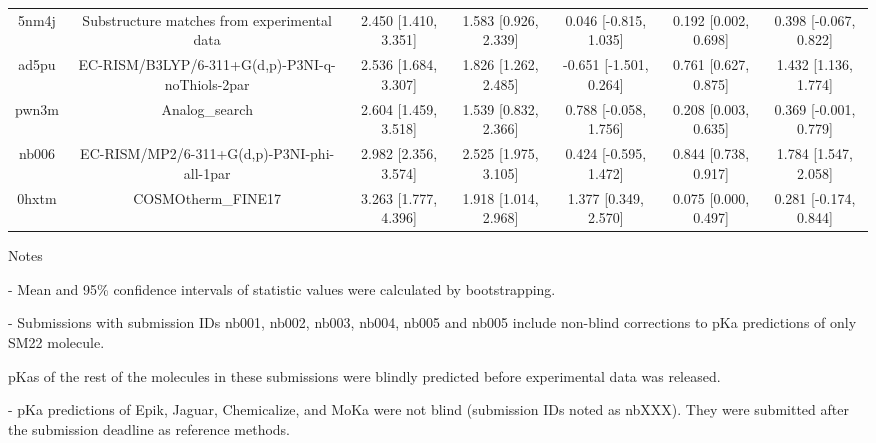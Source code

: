 \documentclass{article}
\begin{document}
\begin{center}
\begin{longtable}{|ccccccc|}
 5nm4j &        Substructure matches from experimental data &  2.450 [1.410, 3.351] &  1.583 [0.926, 2.339] &    0.046 [-0.815, 1.035] &  0.192 [0.002, 0.698] &  0.398 [-0.067, 0.822] \\
 ad5pu &    EC-RISM/B3LYP/6-311+G(d,p)-P3NI-q-noThiols-2par &  2.536 [1.684, 3.307] &  1.826 [1.262, 2.485] &   -0.651 [-1.501, 0.264] &  0.761 [0.627, 0.875] &   1.432 [1.136, 1.774] \\
 pwn3m &                                     Analog\_search &  2.604 [1.459, 3.518] &  1.539 [0.832, 2.366] &    0.788 [-0.058, 1.756] &  0.208 [0.003, 0.635] &  0.369 [-0.001, 0.779] \\
 nb006 &         EC-RISM/MP2/6-311+G(d,p)-P3NI-phi-all-1par &  2.982 [2.356, 3.574] &  2.525 [1.975, 3.105] &    0.424 [-0.595, 1.472] &  0.844 [0.738, 0.917] &   1.784 [1.547, 2.058] \\
 0hxtm &                                 COSMOtherm\_FINE17 &  3.263 [1.777, 4.396] &  1.918 [1.014, 2.968] &     1.377 [0.349, 2.570] &  0.075 [0.000, 0.497] &  0.281 [-0.174, 0.844] \\
\end{longtable}
\end{center}

Notes

- Mean and 95\% confidence intervals of statistic values were calculated by bootstrapping.

- Submissions with submission IDs nb001, nb002, nb003, nb004, nb005 and nb005 include non-blind corrections to pKa predictions of only SM22 molecule.

pKas of the rest of the molecules in these submissions were blindly predicted before experimental data was released.

- pKa predictions of Epik, Jaguar, Chemicalize, and MoKa were not blind (submission IDs noted as nbXXX). They were submitted after the submission deadline as reference methods.
\end{document}
